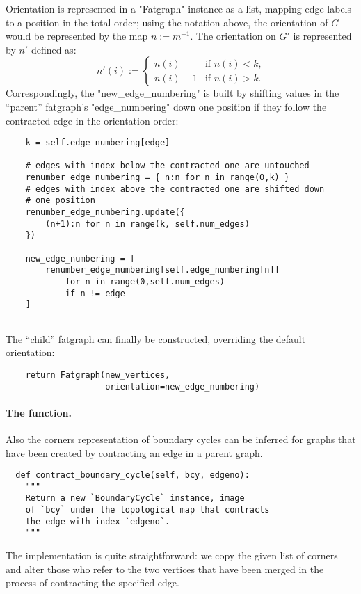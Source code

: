 Orientation is represented in a "Fatgraph" instance as a list, mapping
edge labels to a position in the total order; using the notation
above, the orientation of $G$ would be represented by the map
$n := m^{-1}$.  The orientation on $G'$ is represented by $n'$ defined
as:
\begin{equation*}
  n'(i) :=
  \begin{cases}
    n(i)    &\text{if $n(i)<k$,} 
    \\
    n(i)-1  &\text{if $n(i)>k$.}
  \end{cases}
\end{equation*}
Correspondingly, the "new_edge_numbering" is built by shifting values
in the ``parent'' fatgraph's "edge_numbering" down one position if
they follow the contracted edge in the orientation order:
\begin{lstlisting}
    k = self.edge_numbering[edge]

    # edges with index below the contracted one are untouched
    renumber_edge_numbering = { n:n for n in range(0,k) }
    # edges with index above the contracted one are shifted down
    # one position
    renumber_edge_numbering.update({ 
        (n+1):n for n in range(k, self.num_edges) 
    })

    new_edge_numbering = [ 
        renumber_edge_numbering[self.edge_numbering[n]]
            for n in range(0,self.num_edges)
            if n != edge 
    ]
    
\end{lstlisting}

The ``child'' fatgraph can finally be constructed, overriding the
default orientation:
\begin{lstlisting}
    return Fatgraph(new_vertices, 
                    orientation=new_edge_numbering)

\end{lstlisting}

\paragraph{The  function.}
Also the corners representation of boundary cycles can be inferred for
graphs that have been created by contracting an edge in a parent
graph.
\begin{lstlisting}
  def contract_boundary_cycle(self, bcy, edgeno):
    """
    Return a new `BoundaryCycle` instance, image 
    of `bcy` under the topological map that contracts 
    the edge with index `edgeno`.
    """
\end{lstlisting}
The implementation is quite straightforward: we copy the given list of
corners and alter those who refer to the two vertices that have been
merged in the process of contracting the specified edge.

